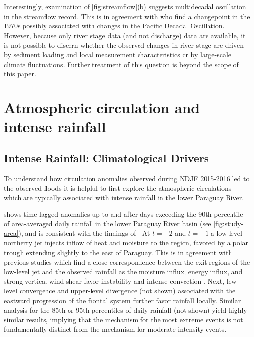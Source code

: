 \documentclass[twocol]{ametsoc}
\begin{document}
Interestingly, examination of \cref{fig:streamflow}(b) suggests multidecadal oscillation in the streamflow record.
This is in agreement with \citet{Collischonn:2001bi,Carvalho2011} who find a changepoint in the 1970s possibly associated with changes in the Pacific Decadal Oscillation.
However, because only river stage data (and not discharge) data are available, it is not possible to discern whether the observed changes in river stage are driven by sediment loading and local measurement characteristics or by large-scale climate fluctuations. Further treatment of this question is beyond the scope of this paper.


\section{Atmospheric circulation and intense rainfall} \label{sec:diagnostics}

\subsection{Intense Rainfall: Climatological Drivers} \label{sec:rainfall-circulation}

To understand how circulation anomalies observed during NDJF 2015-2016 led to the observed floods it is helpful to first explore the atmospheric circulations which are typically associated with intense rainfall in the lower Paraguay River.

 shows time-lagged anomalies up to and after days exceeding the 90th percentile of area-averaged daily rainfall in the lower Paraguay River basin (see \cref{fig:study-area}), and is consistent with the findings of \citet{Marengo2004,Salio:2007gd}.
At $t=-2$ and $t=-1$ a low-level northerry jet injects inflow of heat and moisture to the region, favored by a polar trough extending slightly to the east of Paraguay.
This is in agreement with previous studies which find a close correspondence between the exit regions of the low-level jet and the observed rainfall \citep{Saulo:2007km,Salio:2007gd,Marengo2004,Velasco1987} as the moisture influx, energy influx, and strong vertical wind shear favor instability and intense convection \citep{Marengo2004,Silva2009}.
Next, low-level convergence and upper-level divergence (not shown) associated with the eastward progression of the frontal system further favor rainfall locally.
Similar analysis for the 85th or 95th percentiles of daily rainfall (not shown) yield highly similar results, implying that the mechanism for the most extreme events is not fundamentally distinct from the mechanism for moderate-intensity events.
\end{document}
